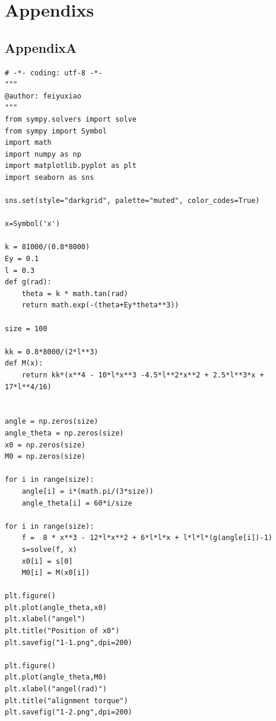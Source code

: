 \documentclass[paper=a4, fontsize=11pt]{scrartcl} %
\numberwithin{equation}{section} %
\numberwithin{figure}{section} %
\numberwithin{table}{section} %
\begin{document}
\section{Appendixs}
\subsection{AppendixA}
\label{AppendixA}
\begin{lstlisting}
# -*- coding: utf-8 -*-
"""
@author: feiyuxiao
"""
from sympy.solvers import solve
from sympy import Symbol
import math
import numpy as np
import matplotlib.pyplot as plt
import seaborn as sns

sns.set(style="darkgrid", palette="muted", color_codes=True)

x=Symbol('x')

k = 81000/(0.8*8000)
Ey = 0.1
l = 0.3
def g(rad):
    theta = k * math.tan(rad)
    return math.exp(-(theta+Ey*theta**3))

size = 100

kk = 0.8*8000/(2*l**3)
def M(x):
    return kk*(x**4 - 10*l*x**3 -4.5*l**2*x**2 + 2.5*l**3*x + 17*l**4/16)


angle = np.zeros(size)
angle_theta = np.zeros(size)
x0 = np.zeros(size)
M0 = np.zeros(size)

for i in range(size):
    angle[i] = i*(math.pi/(3*size))
    angle_theta[i] = 60*i/size

for i in range(size):    
    f =  8 * x**3 - 12*l*x**2 + 6*l*l*x + l*l*l*(g(angle[i])-1)
    s=solve(f, x)
    x0[i] = s[0]
    M0[i] = M(x0[i])
    
plt.figure()
plt.plot(angle_theta,x0)
plt.xlabel("angel")
plt.title("Position of x0")
plt.savefig("1-1.png",dpi=200)

plt.figure()
plt.plot(angle_theta,M0)
plt.xlabel("angel(rad)")
plt.title("alignment torque")
plt.savefig("1-2.png",dpi=200)   
\end{lstlisting}
\end{document}
